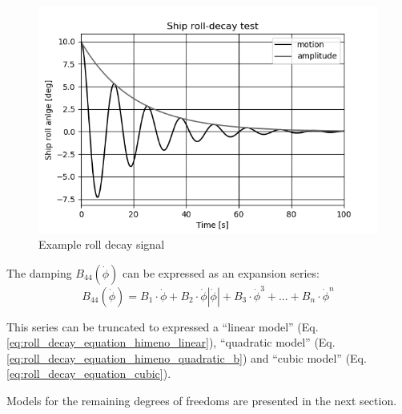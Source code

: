 \begin{figure}[H]
    \centering
    \includegraphics[width=\linewidth]{kappa/images/roll-decay.png}
    \caption{Example roll decay signal}
    \label{fig:rolldecay}
\end{figure}

\noindent The damping $B_{44}\left(\dot{\phi}\right)$ can be expressed as an expansion series:  
\begin{equation}
    B_{44}\left(\dot{\phi}\right) = B_1\cdot\dot{\phi} + B_2\cdot\dot{\phi}\left|\dot{\phi}\right| + B_3\cdot\dot{\phi}^3 + ... + B_n\cdot\dot{\phi}^n
\end{equation}
 
\noindent This series can be truncated to expressed a ``linear model'' (Eq.\ref{eq:roll_decay_equation_himeno_linear}), ``quadratic model'' (Eq.\ref{eq:roll_decay_equation_himeno_quadratic_b}) and ``cubic model'' (Eq.\ref{eq:roll_decay_equation_cubic}).




Models for the remaining degrees of freedoms are presented in the next section.


